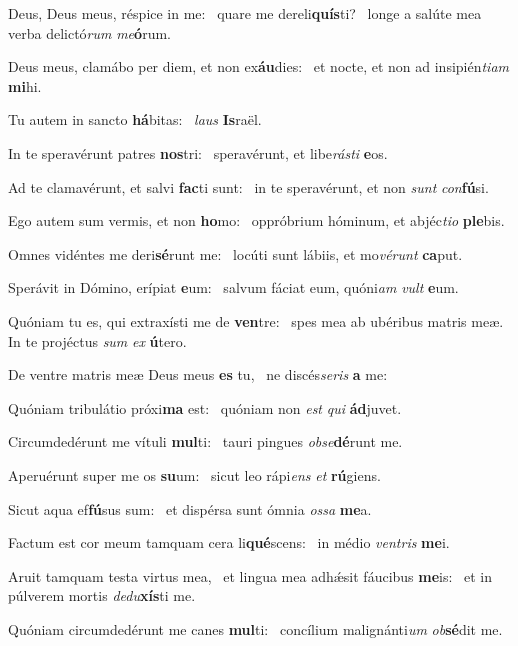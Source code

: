 \item Deus, Deus meus, réspice in me:~\pscross{} quare me dereli\textbf{quís}ti?~\psstar{} longe a salúte mea verba delictó\textit{rum} \textit{me}\textbf{ó}rum.
\item Deus meus, clamábo per diem, et non ex\textbf{áu}dies:~\psstar{} et nocte, et non ad insipién\textit{tiam} \textbf{mi}hi.
\item Tu autem in sancto \textbf{há}bitas:~\psstar{} \textit{laus} \textbf{Is}raël.
\item In te speravérunt patres \textbf{nos}tri:~\psstar{} speravérunt, et libe\textit{rásti} \textbf{e}os.
\item Ad te clamavérunt, et salvi \textbf{fac}ti sunt:~\psstar{} in te speravérunt, et non \textit{sunt} \textit{con}\textbf{fú}si.
\item Ego autem sum vermis, et non \textbf{ho}mo:~\psstar{} oppróbrium hóminum, et abjéc\textit{tio} \textbf{ple}bis.
\item Omnes vidéntes me deri\textbf{sé}runt me:~\psstar{} locúti sunt lábiis, et mo\textit{vérunt} \textbf{ca}put.
\item Sperávit in Dómino, erípiat \textbf{e}um:~\psstar{} salvum fáciat eum, quóni\textit{am} \textit{vult} \textbf{e}um.
\item Quóniam tu es, qui extraxísti me de \textbf{ven}tre:~\psstar{} spes mea ab ubéribus matris meæ. In te projéctus \textit{sum} \textit{ex} \textbf{ú}tero.
\item De ventre matris meæ Deus meus \textbf{es} tu,~\psstar{} ne discés\textit{seris} \textbf{a} me:
\item Quóniam tribulátio próxi\textbf{ma} est:~\psstar{} quóniam non \textit{est} \textit{qui} \textbf{ád}juvet.
\item Circumdedérunt me vítuli \textbf{mul}ti:~\psstar{} tauri pingues \textit{obse}\textbf{dé}runt me.
\item Aperuérunt super me os \textbf{su}um:~\psstar{} sicut leo rápi\textit{ens} \textit{et} \textbf{rú}giens.
\item Sicut aqua ef\textbf{fú}sus sum:~\psstar{} et dispérsa sunt ómnia \textit{ossa} \textbf{me}a.
\item Factum est cor meum tamquam cera li\textbf{qué}scens:~\psstar{} in médio \textit{ventris} \textbf{me}i.
\item Aruit tamquam testa virtus mea,~\pscross{} et lingua mea adhǽsit fáucibus \textbf{me}is:~\psstar{} et in púlverem mortis \textit{dedu}\textbf{xís}ti me.
\item Quóniam circumdedérunt me canes \textbf{mul}ti:~\psstar{} concílium malignánti\textit{um} \textit{ob}\textbf{sé}dit me.
